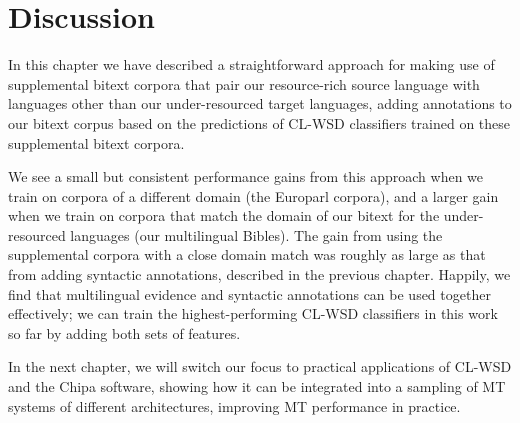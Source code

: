 \section{Discussion}
In this chapter we have described a straightforward approach for making use of
supplemental bitext corpora that pair our resource-rich source language with
languages other than our under-resourced target languages, adding annotations
to our bitext corpus based on the predictions of CL-WSD classifiers trained on
these supplemental bitext corpora.

We see a small but consistent performance gains from this approach when we
train on corpora of a different domain (the Europarl corpora), and a larger
gain when we train on corpora that match the domain of our bitext for the
under-resourced languages (our multilingual Bibles). The gain from using the
supplemental corpora with a close domain match was roughly as large as that
from adding syntactic annotations, described in the previous chapter.
Happily, we find that multilingual evidence and syntactic annotations can be
used together effectively; we can train the highest-performing CL-WSD
classifiers in this work so far by adding both sets of features.

In the next chapter, we will switch our focus to practical applications of
CL-WSD and the Chipa software, showing how it can be integrated into a sampling
of MT systems of different architectures, improving MT performance in practice.
